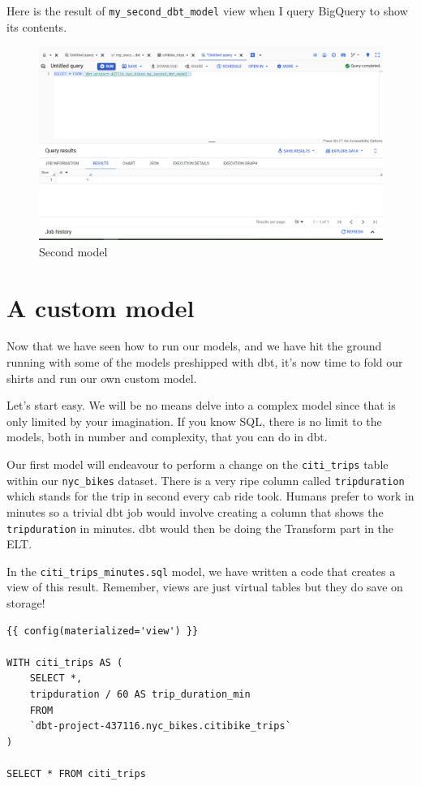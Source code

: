 \documentclass[
]{book}
\begin{document}
Here is the result of \texttt{my\_second\_dbt\_model} view when I query BigQuery to show its contents.

\begin{figure}
\centering
\includegraphics{./images/second_model.png}
\caption{Second model}
\end{figure}

\hypertarget{a-custom-model}{%
\section{A custom model}\label{a-custom-model}}

Now that we have seen how to run our models, and we have hit the ground running with some of the models preshipped with dbt, it's now time to fold our shirts and run our own custom model.

Let's start easy. We will be no means delve into a complex model since that is only limited by your imagination. If you know SQL, there is no limit to the models, both in number and complexity, that you can do in dbt.

Our first model will endeavour to perform a change on the \texttt{citi\_trips} table within our \texttt{nyc\_bikes} dataset. There is a very ripe column called \texttt{tripduration} which stands for the trip in second every cab ride took. Humans prefer to work in minutes so a trivial dbt job would involve creating a column that shows the \texttt{tripduration} in minutes. dbt would then be doing the Transform part in the ELT.

In the \texttt{citi\_trips\_minutes.sql} model, we have written a code that creates a view of this result. Remember, views are just virtual tables but they do save on storage!

\begin{verbatim}
{{ config(materialized='view') }}

WITH citi_trips AS (
    SELECT *, 
    tripduration / 60 AS trip_duration_min
    FROM 
    `dbt-project-437116.nyc_bikes.citibike_trips` 
)

SELECT * FROM citi_trips
\end{verbatim}
\end{document}
